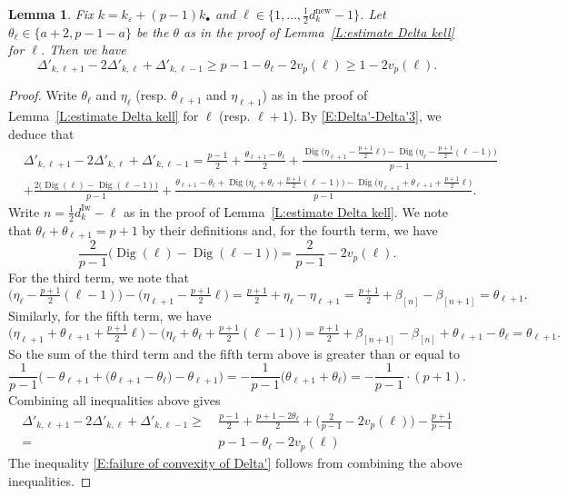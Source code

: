 \documentclass[12pt]{amsart}
\newtheorem{lemma}[subsection]{Lemma}
\theoremstyle{definition}
\numberwithin{equation}{subsection}
\DeclareMathOperator{\Dig}{Dig}
\newcommand{\new}{\mathrm{new}}
\newcommand{\Iw}{\mathrm{Iw}}
\begin{document}
\begin{lemma}
\label{L:failure of convexity of Delta'}
Fix $k =k_\varepsilon + (p-1)k_{\bullet}$ and $\ell \in \{1,\dots, \frac 12 d_{k}^\new-1\}$. 
Let $\theta_\ell \in \{a+2, p-1-a\}$ be the $\theta$ as in the proof of Lemma~\ref{L:estimate Delta kell} for $\ell$.
Then we have
\begin{equation}
\label{E:failure of convexity of Delta'}
\Delta'_{k, \ell+1} -2 \Delta'_{k, \ell}+\Delta'_{k, \ell-1}\geq p-1-\theta_\ell-2v_p(\ell) \geq 1-2v_p(\ell).
\end{equation}
\end{lemma}
\begin{proof}
Write $\theta_\ell$ and $\eta_\ell$ (resp. $\theta_{\ell+1}$ and $\eta_{\ell+1}$) as in the proof of Lemma~\ref{L:estimate Delta kell} for $\ell$ (resp. $\ell+1$). 
By \eqref{E:Delta'-Delta'3}, we deduce that
\begin{align*}
&\Delta'_{k, \ell+1}-2\Delta'_{k,\ell}+\Delta'_{k,\ell-1} = \frac{p-1}2 +\frac{\theta_{\ell+1} - \theta_{\ell}}2 +\frac{\Dig\big(\eta_{\ell+1}-\frac{p+1}2\ell\big) - \Dig \big(\eta_{\ell}- \frac{p+1}2(\ell-1)\big)}{p-1} 
\\ &+ \frac{2\big( \Dig(\ell)-\Dig(\ell-1)\big)}{p-1} + \frac{\theta_{\ell+1} - \theta_{\ell}+\Dig\big(\eta_{\ell}+\theta_{\ell}+\frac{p+1}2(\ell-1)\big) - \Dig \big(\eta_{\ell+1}+\theta_{\ell+1}+ \frac{p+1}2\ell\big)}{p-1}.
\end{align*}
Write $n = \frac 12d_k^\Iw-\ell$ as in the proof of Lemma~\ref{L:estimate Delta kell}. We note that $\theta_\ell + \theta_{\ell+1} = p+1$ by their definitions and, for the fourth term, we have
$$
\frac2{p-1}\big(\Dig(\ell) - \Dig(\ell-1)\big) =\frac2{p-1}-2v_p(\ell).
$$
For the third term, we note that
$$
\big(\eta_{\ell}- \tfrac{p+1}2(\ell-1)\big)- \big(\eta_{\ell+1}-\tfrac{p+1}2\ell\big)  = \tfrac{p+1}2 +\eta_{\ell} -\eta_{\ell+1} = \tfrac{p+1}2 + \beta_{[n]}-\beta_{[n+1]} = \theta_{\ell+1}.
$$
Similarly, for the fifth term, we have
$$
\big(\eta_{\ell+1}+\theta_{\ell+1}+ \tfrac{p+1}2\ell\big) - \big(\eta_{\ell}+\theta_{\ell}+\tfrac{p+1}2(\ell-1)\big) = \tfrac{p+1}2 + \beta_{[n+1]}- \beta_{[n]}+ \theta_{\ell+1}-\theta_{\ell} =\theta_{\ell+1}.
$$
So the sum of the third term and the fifth term above is greater than or equal to
$$
\frac 1{p-1}\Big( -\theta_{\ell+1} + \big(\theta_{\ell+1} - \theta_{\ell} \big) - \theta_{\ell+1}\Big) =- \frac1{p-1} \big(\theta_{\ell+1} + \theta_{\ell}\big) =- \frac 1{p-1} \cdot (p+1). 
$$
Combining all inequalities above gives
\begin{align*}
\Delta'_{k, \ell+1}-2\Delta'_{k,\ell} + \Delta'_{k, \ell-1} \geq\ & \frac{p-1}2 + \frac{p+1-2\theta_\ell}2 +\Big(\frac2{p-1}-2v_p(\ell)\Big) - \frac{p+1}{p-1} 
\\
=\ & p-1-\theta_\ell  -2 v_p(\ell)
\end{align*}
The inequality \eqref{E:failure of convexity of Delta'} follows from combining the above inequalities.
\end{proof}
\end{document}
